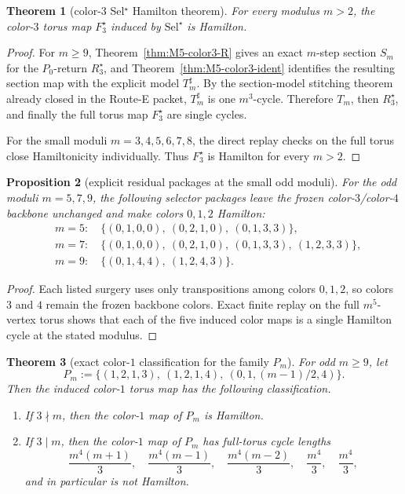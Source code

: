 \documentclass[11pt]{article}
\newtheorem{theorem}{Theorem}[section]
\newtheorem{proposition}[theorem]{Proposition}
\newcommand{\SelStar}{\mathrm{Sel}^{\star}}
\newcommand{\Pzero}{P_0}
\newcommand{\Ssec}{S_m}
\newcommand{\Tsharp}{T_m^{\sharp}}
\begin{document}
\begin{theorem}[color-$3$ Sel$^{\star}$ Hamilton theorem]
\label{thm:M5-color3}
For every modulus \(m>2\), the color-$3$ torus map \(F_3^\star\) induced by
\(\SelStar\) is Hamilton.
\end{theorem}

\begin{proof}
For \(m\ge 9\), Theorem~\ref{thm:M5-color3-R} gives an exact \(m\)-step section
\(\Ssec\) for the \(\Pzero\)-return \(R_3^\star\), and
Theorem~\ref{thm:M5-color3-ident} identifies the resulting section map with the
explicit model \(\Tsharp\).
By the section-model stitching theorem already closed in the Route-E packet,
\(\Tsharp\) is one \(m^3\)-cycle.  Therefore \(T_m\), then \(R_3^\star\), and
finally the full torus map \(F_3^\star\) are single cycles.

For the small moduli \(m=3,4,5,6,7,8\), the direct replay checks on the full
torus close Hamiltonicity individually.
Thus \(F_3^\star\) is Hamilton for every \(m>2\).
\end{proof}


\begin{proposition}[explicit residual packages at the small odd moduli]
\label{prop:residual-small-579}
For the odd moduli $m=5,7,9$, the following selector packages leave the frozen
color-$3$/color-$4$ backbone unchanged and make colors $0,1,2$ Hamilton:
\begin{align*}
&m=5:\quad \{(0,1,0,0),\ (0,2,1,0),\ (0,1,3,3)\},\\
&m=7:\quad \{(0,1,0,0),\ (0,2,1,0),\ (0,1,3,3),\ (1,2,3,3)\},\\
&m=9:\quad \{(0,1,4,4),\ (1,2,4,3)\}.
\end{align*}
\end{proposition}

\begin{proof}
Each listed surgery uses only transpositions among colors $0,1,2$, so colors
$3$ and $4$ remain the frozen backbone colors.
Exact finite replay on the full $m^5$-vertex torus shows that each of the five
induced color maps is a single Hamilton cycle at the stated modulus.
\end{proof}

\begin{theorem}[exact color-$1$ classification for the family $P_m$]
\label{thm:Pm-color1-classification}
For odd $m\ge 9$, let
\[
P_m:=\{(1,2,1,3),\ (1,2,1,4),\ (0,1,(m-1)/2,4)\}.
\]
Then the induced color-$1$ torus map has the following classification.
\begin{enumerate}[label=\textup{(\alph*)},leftmargin=2.8em]
\item If $3\nmid m$, then the color-$1$ map of $P_m$ is Hamilton.
\item If $3\mid m$, then the color-$1$ map of $P_m$ has full-torus cycle
      lengths
      \[
      \frac{m^4(m+1)}3,\quad \frac{m^4(m-1)}3,\quad \frac{m^4(m-2)}3,
      \quad \frac{m^4}3,\quad \frac{m^4}3,
      \]
      and in particular is not Hamilton.
\end{enumerate}
\end{theorem}
\end{document}
